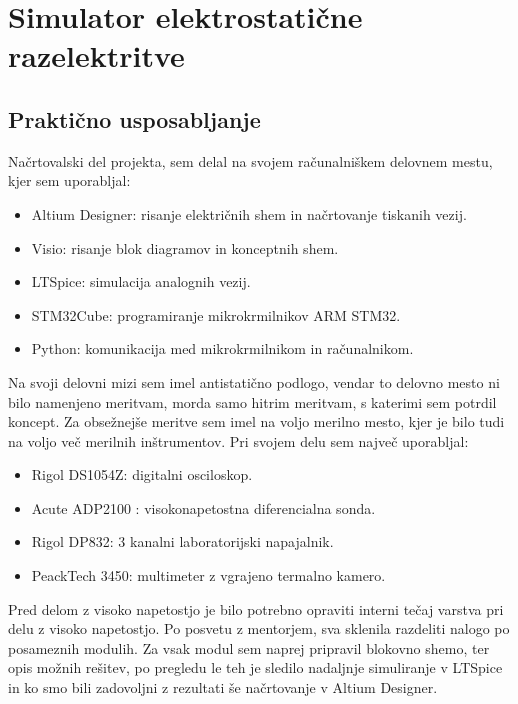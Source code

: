 \documentclass[a4paper,twoside,openright,12pt,Slovene]{book}
\begin{document}
\chapter{Simulator elektrostatične razelektritve} \label{ESDSIM}

	\section{Praktično usposabljanje}
	Načrtovalski del projekta, sem delal na svojem računalniškem delovnem mestu, kjer sem uporabljal:
	\begin{itemize}
		\item Altium Designer: risanje električnih shem in načrtovanje tiskanih vezij.
		\item Visio: risanje blok diagramov in konceptnih shem.
		\item LTSpice: simulacija analognih vezij.
		\item STM32Cube: programiranje mikrokrmilnikov ARM STM32.
		\item Python: komunikacija med mikrokrmilnikom in računalnikom.
	\end{itemize}
	Na svoji delovni mizi sem imel antistatično podlogo, vendar to delovno mesto ni bilo namenjeno meritvam, morda samo hitrim meritvam, s katerimi sem potrdil koncept.
	Za obsežnejše meritve sem imel na voljo merilno mesto, kjer je bilo tudi na voljo več merilnih inštrumentov. Pri svojem delu sem največ uporabljal:
	\begin{itemize}
		\item Rigol DS1054Z: digitalni osciloskop.
		\item Acute ADP2100 : visokonapetostna diferencialna sonda.
		\item Rigol DP832: 3 kanalni laboratorijski napajalnik.
		\item PeackTech 3450: multimeter z vgrajeno termalno kamero.
	\end{itemize}
	Pred delom z visoko napetostjo je bilo potrebno opraviti interni tečaj varstva pri delu z visoko napetostjo. Po posvetu z mentorjem, sva sklenila razdeliti nalogo po posameznih modulih. Za vsak modul sem naprej pripravil blokovno shemo, ter opis možnih rešitev, po pregledu le teh je sledilo nadaljnje simuliranje v LTSpice in ko smo bili zadovoljni z rezultati še načrtovanje v Altium Designer.
	
\end{document}
